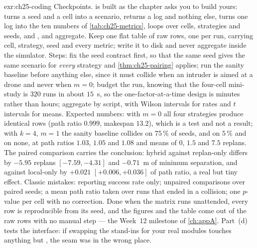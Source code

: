 
\begin{solution}{exr:ch25-coding}
Checkpoints.  is built as the chapter asks you to build yours:
 turns a seed and a cell into a scenario,  returns
a log and nothing else,  turns one log into the ten numbers of
\cref{tab:ch25-metrics},  loops over cells, strategies and seeds, and
,  and  aggregate. Keep one flat table of raw
rows, one per run, carrying cell, strategy, seed and every metric; write it to disk and
never aggregate inside the simulator. Steps: fix the seed contract first, so that the same
seed gives the same scenario for \emph{every} strategy and \cref{thm:ch25-pairing}
applies; run the sanity baseline before anything else, since it must collide when an
intruder is aimed at a drone and never when $m=0$; budget the run, knowing that the
four-cell mini-study is $320$ runs in about $15$~s, so the one-factor-at-a-time design is
minutes rather than hours; aggregate by script, with Wilson intervals for rates and $t$
intervals for means. Expected numbers: with $m=0$ all four strategies produce identical
rows (path ratio $0.999$, makespan $13.2$), which is a test and not a result; with $k=4$,
$m=1$ the sanity baseline collides on $75\,\%$ of seeds,  and  on
$5\,\%$ and  on none, at path ratios $1.03$, $1.05$ and $1.08$ and means of
$0$, $1.5$ and $7.5$ replans. The paired comparison carries the conclusion: hybrid against
replan-only differs by $-5.95$ replans $[-7.59,-4.31]$ and $-0.71$~m of minimum
separation, and against local-only by $+0.021$ $[+0.006,+0.036]$ of path ratio, a real but
tiny effect. Classic mistakes: reporting success rate only; unpaired comparisons over
paired seeds; a mean path ratio taken over runs that ended in a collision; one $p$-value
per cell with no correction. Done when the matrix runs unattended, every row is
reproducible from its seed, and the figures and the table come out of the raw rows with no
manual step --- the Week~12 milestone of \cref{ch:appA}. Part~(d) tests the interface: if
swapping the stand-ins for your real modules touches anything but , the
seam was in the wrong place.
\end{solution}

